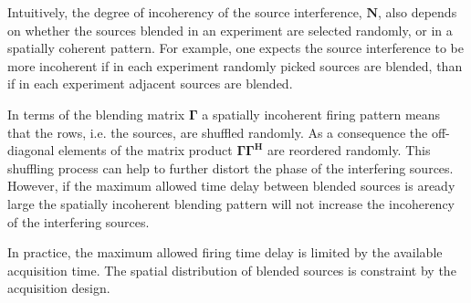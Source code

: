 Intuitively, the degree of incoherency of the source interference, $\mathbf{N}$, also depends on whether the sources blended in an experiment are selected randomly, or in a spatially coherent pattern. For example, one expects the source interference to be more incoherent if in each experiment randomly picked sources are blended, than if in each experiment adjacent sources are blended.

In terms of the blending matrix $\mathbf{\Gamma}$ a spatially incoherent firing pattern means that the rows, i.e. the sources, are shuffled randomly. As a consequence the off-diagonal elements of the matrix product $\mathbf{\Gamma \Gamma^H}$ are reordered randomly. This shuffling process can help to further distort the phase of the interfering sources. However, if the maximum allowed time delay between blended sources is aready large the spatially incoherent blending pattern will not increase the incoherency of the interfering sources.   

In practice, the maximum allowed firing time delay is limited by the available acquisition time. The spatial distribution of blended sources is constraint by the acquisition design.


